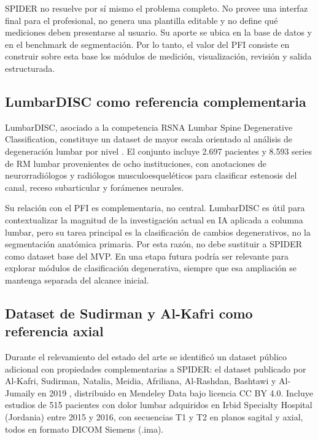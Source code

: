 SPIDER no resuelve por sí mismo el problema completo. No provee una interfaz final para el profesional, no genera una plantilla editable y no define qué mediciones deben presentarse al usuario. Su aporte se ubica en la base de datos y en el benchmark de segmentación. Por lo tanto, el valor del PFI consiste en construir sobre esta base los módulos de medición, visualización, revisión y salida estructurada.

\subsection{LumbarDISC como referencia complementaria}

LumbarDISC, asociado a la competencia RSNA Lumbar Spine Degenerative Classification, constituye un dataset de mayor escala orientado al análisis de degeneración lumbar por nivel \parencite{richards_lumbardisc_2026}. El conjunto incluye 2.697 pacientes y 8.593 series de RM lumbar provenientes de ocho instituciones, con anotaciones de neurorradiólogos y radiólogos musculoesqueléticos para clasificar estenosis del canal, receso subarticular y forámenes neurales.

Su relación con el PFI es complementaria, no central. LumbarDISC es útil para contextualizar la magnitud de la investigación actual en IA aplicada a columna lumbar, pero su tarea principal es la clasificación de cambios degenerativos, no la segmentación anatómica primaria. Por esta razón, no debe sustituir a SPIDER como dataset base del MVP. En una etapa futura podría ser relevante para explorar módulos de clasificación degenerativa, siempre que esa ampliación se mantenga separada del alcance inicial.

\subsection{Dataset de Sudirman y Al-Kafri como referencia axial}

Durante el relevamiento del estado del arte se identificó un dataset público adicional con propiedades complementarias a SPIDER: el dataset publicado por Al-Kafri, Sudirman, Natalia, Meidia, Afriliana, Al-Rashdan, Bashtawi y Al-Jumaily en 2019 \parencite{alkafri_sudirman_boundary_2019}, distribuido en Mendeley Data bajo licencia CC BY 4.0. Incluye estudios de 515 pacientes con dolor lumbar adquiridos en Irbid Specialty Hospital (Jordania) entre 2015 y 2016, con secuencias T1 y T2 en planos sagital y axial, todos en formato DICOM Siemens (.ima).

